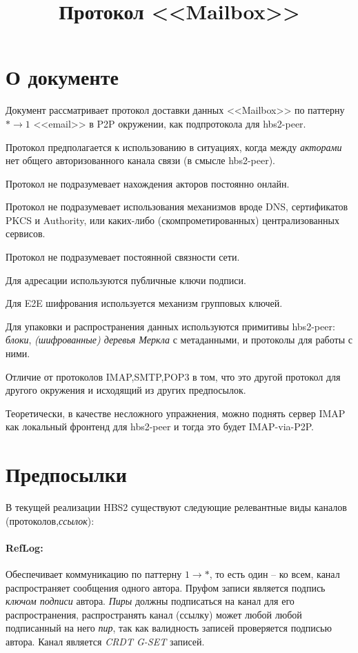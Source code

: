 \documentclass[11pt,a4paper]{article}
\title{Протокол <<Mailbox>>}
\newcommand{\term}[2]{\textit{#2}}
\begin{document}
\maketitle

\section{О документе}

Документ рассматривает протокол доставки данных <<Mailbox>> по паттерну $*
\rightarrow 1$ <<email>> в P2P окружении, как подпротокола  для hbs2-peer.

Протокол предполагается к использованию в ситуациях, когда между
\term{actor}{акторами} нет общего авторизованного канала связи (в смысле
hbs2-peer).

Протокол не подразумевает нахождения акторов постоянно онлайн.

Протокол не подразумевает использования механизмов вроде DNS, сертификатов PKCS
и Authority, или каких-либо (скомпрометированных) централизованных сервисов.

Протокол не подразумевает постоянной связности сети.

Для адресации используются публичные ключи подписи.

Для E2E шифрования используется механизм групповых ключей.

Для упаковки и распространения данных используются примитивы hbs2-peer:
\term{block}{блоки}, \term{merkle}{(шифрованные) деревья Меркла} с метаданными,
и протоколы для работы с ними.

Отличие от протоколов IMAP,SMTP,POP3 в том, что это другой протокол для другого
окружения и исходящий из других предпосылок.

Теоретически, в качестве несложного упражнения, можно поднять сервер IMAP как
локальный фронтенд для hbs2-peer и тогда это будет IMAP-via-P2P.

\section{Предпосылки}

В текущей реализации HBS2 существуют следующие релевантные виды каналов
(протоколов,\term{ref}{ссылок}):

\paragraph{RefLog:}

Обеспечивает коммуникацию по паттерну   $1 \rightarrow *$, то есть один -- ко
всем, канал распространяет сообщения одного автора. Пруфом записи является
подпись \term{ksign}{ключом подписи} автора. \term{peer}{Пиры} должны
подписаться на канал для его распространения, распространять канал (ссылку)
может любой любой подписанный на него \term{peer}{пир}, так как валидность
записей проверяется подписью автора. Канал является \term{GSET}{CRDT G-SET}
записей.
\end{document}
